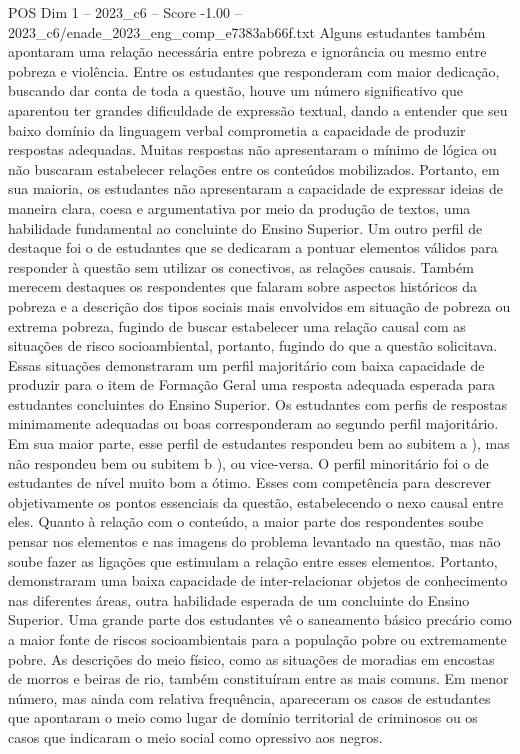 \begin{textsample}{POS Dim 1 – 2023\_c6 – Score -1.00 – 2023\_c6/enade\_2023\_eng\_comp\_e7383ab66f.txt}
Alguns estudantes também apontaram uma relação necessária entre pobreza e ignorância ou mesmo entre pobreza e violência.
Entre os estudantes que responderam com maior dedicação, buscando dar conta de toda a questão, houve um número significativo que aparentou ter grandes dificuldade de expressão textual, dando a entender que seu baixo domínio da linguagem verbal comprometia a capacidade de produzir respostas adequadas.
Muitas respostas não apresentaram o mínimo de lógica ou não buscaram estabelecer relações entre os conteúdos mobilizados.
Portanto, em sua maioria, os estudantes não apresentaram a capacidade de expressar ideias de maneira clara, coesa e argumentativa por meio da produção de textos, uma habilidade fundamental ao concluinte do Ensino Superior.
Um outro perfil de destaque foi o de estudantes que se dedicaram a pontuar elementos válidos para responder à questão sem utilizar os conectivos, as relações causais.
Também merecem destaques os respondentes que falaram sobre aspectos históricos da pobreza e a descrição dos tipos sociais mais envolvidos em situação de pobreza ou extrema pobreza, fugindo de buscar estabelecer uma relação causal com as situações de risco socioambiental, portanto, fugindo do que a questão solicitava.
Essas situações demonstraram um perfil majoritário com baixa capacidade de produzir para o item de Formação Geral uma resposta adequada esperada para estudantes concluintes do Ensino Superior.
Os estudantes com perfis de respostas minimamente adequadas ou boas corresponderam ao segundo perfil majoritário.
Em sua maior parte, esse perfil de estudantes respondeu bem ao subitem a ), mas não respondeu bem ou subitem b ), ou vice-versa.
O perfil minoritário foi o de estudantes de nível muito bom a ótimo.
Esses com competência para descrever objetivamente os pontos essenciais da questão, estabelecendo o nexo causal entre eles.
Quanto à relação com o conteúdo, a maior parte dos respondentes soube pensar nos elementos e nas imagens do problema levantado na questão, mas não soube fazer as ligações que estimulam a relação entre esses elementos.
Portanto, demonstraram uma baixa capacidade de inter-relacionar objetos de conhecimento nas diferentes áreas, outra habilidade esperada de um concluinte do Ensino Superior.
Uma grande parte dos estudantes vê o saneamento básico precário como a maior fonte de riscos socioambientais para a população pobre ou extremamente pobre.
As descrições do meio físico, como as situações de moradias em encostas de morros e beiras de rio, também constituíram entre as mais comuns.
Em menor número, mas ainda com relativa frequência, apareceram os casos de estudantes que apontaram o meio como lugar de domínio territorial de criminosos ou os casos que indicaram o meio social como opressivo aos negros.

\end{textsample}
